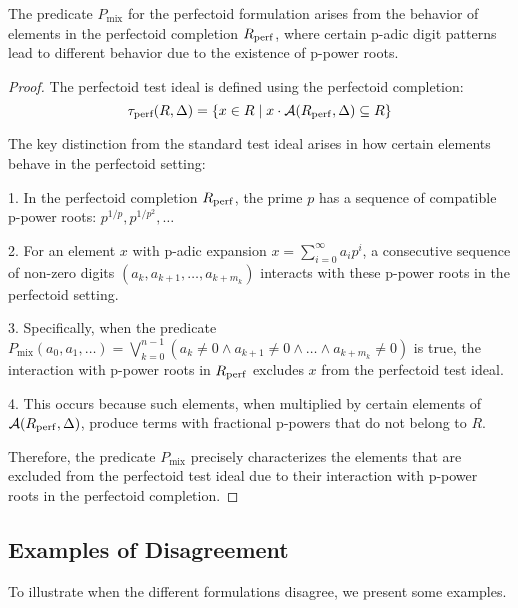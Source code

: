 \begin{theorem}\label{thm:perfectoid-predicate-motivation}
The predicate $P_{\text{mix}}$ for the perfectoid formulation arises from the behavior of elements in the perfectoid completion $R_{\operatorname{perf}}$, where certain p-adic digit patterns lead to different behavior due to the existence of p-power roots.
\end{theorem}

\begin{proof}
The perfectoid test ideal is defined using the perfectoid completion:
$$\tau_{\text{perf}}(R,\Delta) = \{x \in R \mid x \cdot \mathcal{A}(R_{\operatorname{perf}}, \Delta) \subseteq R\}$$

The key distinction from the standard test ideal arises in how certain elements behave in the perfectoid setting:

1. In the perfectoid completion $R_{\operatorname{perf}}$, the prime $p$ has a sequence of compatible p-power roots: $p^{1/p}, p^{1/p^2}, \ldots$

2. For an element $x$ with p-adic expansion $x = \sum_{i=0}^{\infty} a_i p^i$, a consecutive sequence of non-zero digits $(a_k, a_{k+1}, \ldots, a_{k+m_k})$ interacts with these p-power roots in the perfectoid setting.

3. Specifically, when the predicate $P_{\text{mix}}(a_0, a_1, \ldots) = \bigvee_{k=0}^{n-1} \left(a_k \neq 0 \wedge a_{k+1} \neq 0 \wedge \ldots \wedge a_{k+m_k} \neq 0\right)$ is true, the interaction with p-power roots in $R_{\operatorname{perf}}$ excludes $x$ from the perfectoid test ideal.

4. This occurs because such elements, when multiplied by certain elements of $\mathcal{A}(R_{\operatorname{perf}}, \Delta)$, produce terms with fractional p-powers that do not belong to $R$.

Therefore, the predicate $P_{\text{mix}}$ precisely characterizes the elements that are excluded from the perfectoid test ideal due to their interaction with p-power roots in the perfectoid completion.
\end{proof}

\subsection{Examples of Disagreement}

To illustrate when the different formulations disagree, we present some examples.

